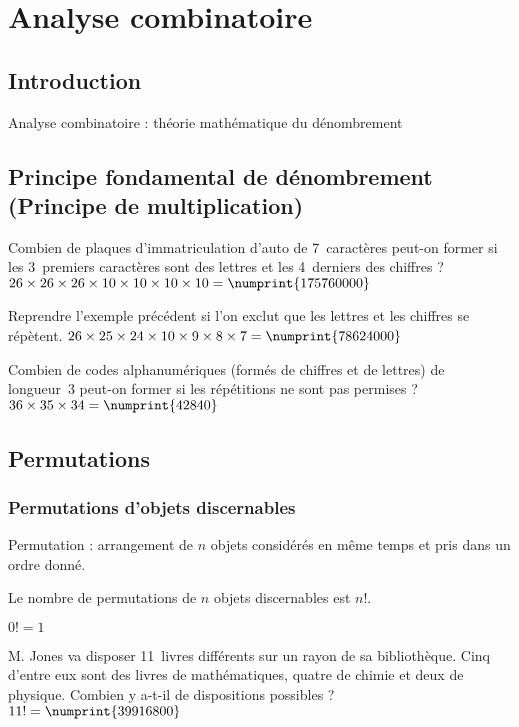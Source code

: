 \chapter{Analyse combinatoire}
\section{Introduction}
Analyse combinatoire : théorie mathématique du dénombrement



\section[Principe fondamental de dénombrement (Principe de multiplication)]{Principe fondamental de dénombrement\\(Principe de multiplication)}

 Combien de plaques d’immatriculation d’auto de 7~caractères peut-on former si les 3~premiers caractères sont des lettres et les 4~derniers des chiffres ?
 $26 \times 26 \times 26 \times 10 \times 10 \times 10 \times 10 = \numprint{175760000}$

 Reprendre l’exemple précédent si l’on exclut que les lettres et les chiffres se répètent.
 $26 \times 25 \times 24 \times 10 \times 9 \times 8 \times 7 = \numprint{78624000}$

 Combien de codes alphanumériques (formés de chiffres et de lettres) de longueur~3 peut-on former si les répétitions ne sont pas permises ?
\sol $36 \times 35 \times 34 = \numprint{42840}$



\section{Permutations}
\subsection{Permutations d’objets discernables}
Permutation : arrangement de $n$ objets considérés en même temps et pris dans un ordre donné.

Le nombre de permutations de $n$ objets discernables est $n!$.

$0! = 1$

 M. Jones va disposer 11~livres différents sur un rayon de sa bibliothèque. Cinq d’entre eux sont des livres de mathématiques, quatre de chimie et deux de physique. Combien y a-t-il de dispositions possibles ?
\sol $11! = \numprint{39916800}$

